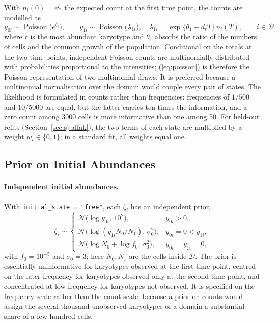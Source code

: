 \documentclass[11pt]{article}
\newcommand{\Normal}{\mathcal{N}}
\begin{document}
With $n_i(0)=e^{\zeta_i}$ the expected count at the first time point, the counts
are modelled as
\begin{equation}
  y_{0i}\sim\operatorname{Poisson}\bigl(e^{\zeta_i}\bigr),
  \qquad
  y_{1i}\sim\operatorname{Poisson}\bigl(\lambda_{1i}\bigr),
  \quad
  \lambda_{1i}=\exp\bigl\{\theta_1-d_rT\bigr\}\,n_i(T),
  \qquad i\in\mathcal{D},
  \label{eq:poisson}
\end{equation}
where $r$ is the most abundant karyotype and $\theta_1$ absorbs the ratio of
the numbers of cells and the common growth of the population. Conditional on the
totals at the two time points, independent Poisson counts are multinomially distributed with
probabilities proportional to the intensities; (\ref{eq:poisson}) is therefore
the Poisson representation of two multinomial draws. It is preferred
because a multinomial normalisation over the domain would couple every pair
of states. The likelihood is formulated in counts rather than frequencies:
frequencies of $1/500$ and $10/5000$ are equal, but the latter carries ten
times the information, and a zero count among 3000 cells is more informative
than one among 50. For held-out refits (Section~\ref{sec:sj-alfak}), the two
terms of each state are multiplied by a weight $w_i\in\{0,1\}$; in a standard
fit, all weights equal one.

\subsection{Prior on Initial Abundances}
\label{sec:sj-initial}

\paragraph{Independent initial abundances.}
With \texttt{initial\_state = "free"}, each $\zeta_i$ has an independent
prior,
\begin{equation}
  \zeta_i\sim
  \begin{cases}
  \Normal\bigl(\log y_{0i},\,10^2\bigr), & y_{0i}>0,\\
  \Normal\bigl(\log(y_{1i}N_0/N_1),\,\sigma_0^2\bigr), & y_{0i}=0<y_{1i},\\
  \Normal\bigl(\log N_0+\log f_0,\,\sigma_0^2\bigr), & y_{0i}=y_{1i}=0,
  \end{cases}
  \label{eq:free-prior}
\end{equation}
with $f_0=10^{-5}$ and $\sigma_0=3$; here $N_0,N_1$ are the cells inside
$\mathcal D$. The prior is essentially uninformative
for karyotypes observed at the first time point, centred on the later frequency
for karyotypes observed only at the second time point, and concentrated at low
frequency for karyotypes not observed. It is specified on the frequency scale
rather than the count scale, because a prior on counts would assign the
several thousand unobserved karyotypes of a domain a substantial share of a
few hundred cells.
\end{document}
